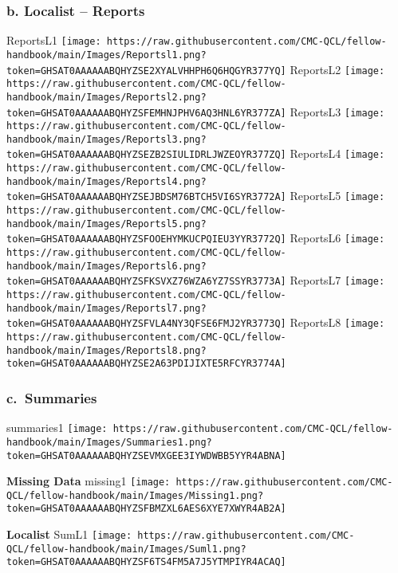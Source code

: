 \documentclass[
]{book}
\begin{document}
\hypertarget{b.-localist-reports}{%
\subsubsection{\texorpdfstring{b. Localist -- Reports }{b. Localist -- Reports }}\label{b.-localist-reports}}

ReportsL1
\texttt{[image: https://raw.githubusercontent.com/CMC-QCL/fellow-handbook/main/Images/Reportsl1.png?token=GHSAT0AAAAAABQHYZSE2XYALVHHPH6Q6HQGYR377YQ]}
ReportsL2
\texttt{[image: https://raw.githubusercontent.com/CMC-QCL/fellow-handbook/main/Images/Reportsl2.png?token=GHSAT0AAAAAABQHYZSFEMHNJPHV6AQ3HNL6YR377ZA]}
ReportsL3
\texttt{[image: https://raw.githubusercontent.com/CMC-QCL/fellow-handbook/main/Images/Reportsl3.png?token=GHSAT0AAAAAABQHYZSEZB2SIULIDRLJWZEOYR377ZQ]}
ReportsL4
\texttt{[image: https://raw.githubusercontent.com/CMC-QCL/fellow-handbook/main/Images/Reportsl4.png?token=GHSAT0AAAAAABQHYZSEJBDSM76BTCH5VI6SYR3772A]}
ReportsL5
\texttt{[image: https://raw.githubusercontent.com/CMC-QCL/fellow-handbook/main/Images/Reportsl5.png?token=GHSAT0AAAAAABQHYZSFOOEHYMKUCPQIEU3YYR3772Q]}
ReportsL6
\texttt{[image: https://raw.githubusercontent.com/CMC-QCL/fellow-handbook/main/Images/Reportsl6.png?token=GHSAT0AAAAAABQHYZSFKSVXZ76WZA6YZ7SSYR3773A]}
ReportsL7
\texttt{[image: https://raw.githubusercontent.com/CMC-QCL/fellow-handbook/main/Images/Reportsl7.png?token=GHSAT0AAAAAABQHYZSFVLA4NY3QFSE6FMJ2YR3773Q]}
ReportsL8
\texttt{[image: https://raw.githubusercontent.com/CMC-QCL/fellow-handbook/main/Images/Reportsl8.png?token=GHSAT0AAAAAABQHYZSE2A63PDIJIXTE5RFCYR3774A]}

\hypertarget{c.-summaries}{%
\subsubsection{\texorpdfstring{c.~Summaries }{c.~Summaries }}\label{c.-summaries}}

summaries1
\texttt{[image: https://raw.githubusercontent.com/CMC-QCL/fellow-handbook/main/Images/Summaries1.png?token=GHSAT0AAAAAABQHYZSEVMXGEE3IYWDWBB5YYR4ABNA]}

\textbf{Missing Data}
missing1
\texttt{[image: https://raw.githubusercontent.com/CMC-QCL/fellow-handbook/main/Images/Missing1.png?token=GHSAT0AAAAAABQHYZSFBMZXL6AES6XYE7XWYR4AB2A]}

\textbf{Localist}
SumL1
\texttt{[image: https://raw.githubusercontent.com/CMC-QCL/fellow-handbook/main/Images/Suml1.png?token=GHSAT0AAAAAABQHYZSF6TS4FM5A7J5YTMPIYR4ACAQ]}
\end{document}
